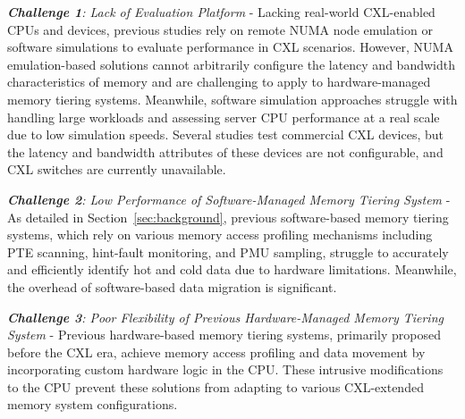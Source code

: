 \noindent\emph{\textbf{Challenge 1}: Lack of Evaluation Platform} - 
Lacking real-world CXL-enabled CPUs and devices, previous studies rely on remote NUMA node emulation or software simulations to evaluate performance in CXL scenarios.
However, NUMA emulation-based solutions cannot arbitrarily configure the latency and bandwidth characteristics of memory and are challenging to apply to hardware-managed memory tiering systems. 
Meanwhile, software simulation approaches struggle with handling large workloads and assessing server CPU performance at a real scale due to low simulation speeds. 
Several studies test commercial CXL devices, but the latency and bandwidth attributes of these devices are not configurable, and CXL switches are currently unavailable.


\noindent\emph{\textbf{Challenge 2}: Low Performance of Software-Managed Memory Tiering System} - 
As detailed in Section~\ref{sec:background}, previous software-based memory tiering systems, which rely on various memory access profiling mechanisms including PTE scanning, hint-fault monitoring, and PMU sampling, struggle to accurately and efficiently identify hot and cold data due to hardware limitations. Meanwhile, the overhead of software-based data migration is significant.

\noindent\emph{\textbf{Challenge 3}: Poor Flexibility of Previous Hardware-Managed Memory Tiering System} - Previous hardware-based memory tiering systems, primarily proposed before the CXL era, achieve memory access profiling and data movement by incorporating custom hardware logic in the CPU. These intrusive modifications to the CPU prevent these solutions from adapting to various CXL-extended memory system configurations.

